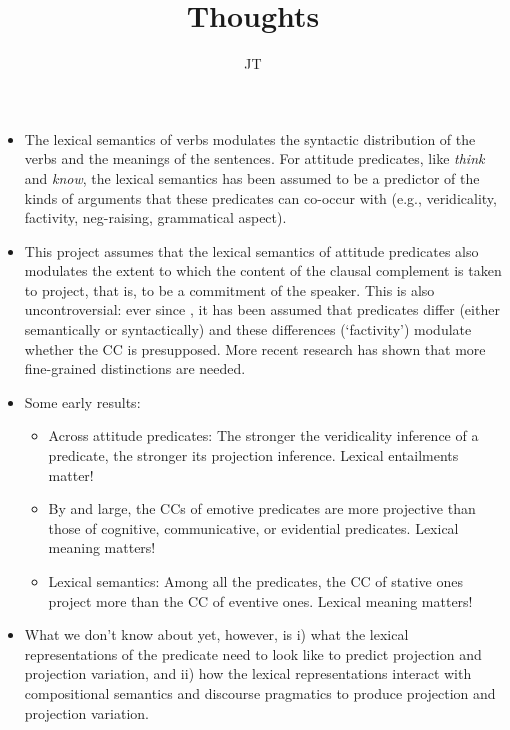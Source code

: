 \documentclass[11pt,fleqn]{article}
\title{Thoughts}
\author{JT}
\newcommand{\6}{\mbox{$[\hspace*{-.6mm}[$}}
\newcommand{\9}{\mbox{$]\hspace*{-.6mm}]$}}
\begin{document}
\maketitle

\begin{itemize}[leftmargin=12pt]

\item The lexical semantics of verbs modulates the syntactic distribution of the verbs and the meanings of the sentences. For attitude predicates, like {\em think} and {\em know}, the lexical semantics has been assumed to be a predictor of the kinds of arguments that these predicates can co-occur with (e.g., veridicality, factivity, neg-raising, grammatical aspect).

\item This project assumes that the lexical semantics of attitude predicates also modulates the extent to which the content of the clausal complement is taken to project, that is, to be a commitment of the speaker. This is also uncontroversial: ever since \citealt{kiparsky-kiparsky70}, it has been assumed that predicates differ (either semantically or syntactically) and these differences (`factivity') modulate whether the CC is presupposed. More recent research has shown that more fine-grained distinctions are needed.

\item Some early results:

\begin{itemize}

\item Across attitude predicates: The stronger the veridicality inference of a predicate, the stronger its projection inference. Lexical entailments matter!

\item By and large, the CCs of emotive predicates are more projective than those of cognitive, communicative, or evidential predicates. Lexical meaning matters!

\item Lexical semantics: Among all the predicates, the CC of stative ones project more than the CC of eventive ones. Lexical meaning matters!

\end{itemize}

\item What we don't know about yet, however, is i) what the lexical representations of the predicate need to look like to predict projection and projection variation, and ii) how the lexical representations interact with compositional semantics and discourse pragmatics to produce projection and projection variation.


\end{itemize}
\end{document}
